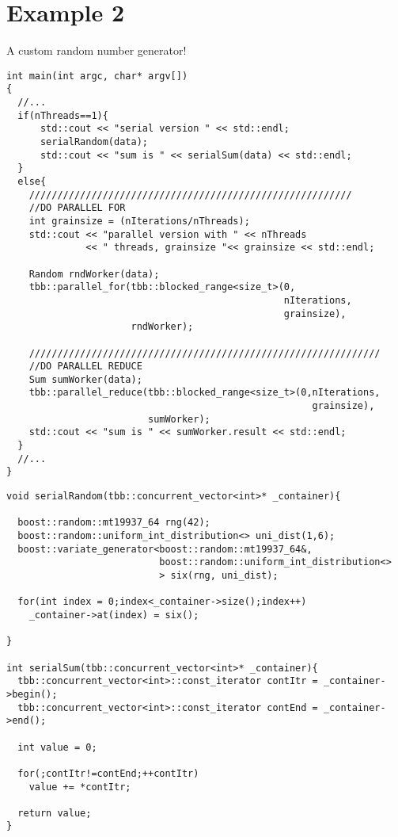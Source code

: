 \documentclass[a4paper]{article}
\begin{document}
\section*{Example 2}
A custom random number generator!
\begin{lstlisting}[float=ht,caption={\large \textbf{Calling Serial and Parallel Code}}]
int main(int argc, char* argv[])
{
  //...
  if(nThreads==1){
      std::cout << "serial version " << std::endl;
      serialRandom(data);
      std::cout << "sum is " << serialSum(data) << std::endl;
  }
  else{
    /////////////////////////////////////////////////////////
    //DO PARALLEL FOR
    int grainsize = (nIterations/nThreads);
    std::cout << "parallel version with " << nThreads  
              << " threads, grainsize "<< grainsize << std::endl;
  
    Random rndWorker(data);
    tbb::parallel_for(tbb::blocked_range<size_t>(0,
                                                 nIterations,
                                                 grainsize),
                      rndWorker);
  
    //////////////////////////////////////////////////////////////
    //DO PARALLEL REDUCE
    Sum sumWorker(data);
    tbb::parallel_reduce(tbb::blocked_range<size_t>(0,nIterations,
                                                      grainsize),
                         sumWorker);
    std::cout << "sum is " << sumWorker.result << std::endl;
  }
  //...
}
\end{lstlisting}
\newpage
\begin{lstlisting}[float=ht,caption={\large \textbf{Serial}}]
void serialRandom(tbb::concurrent_vector<int>* _container){
  
  boost::random::mt19937_64 rng(42);
  boost::random::uniform_int_distribution<> uni_dist(1,6);
  boost::variate_generator<boost::random::mt19937_64&, 
                           boost::random::uniform_int_distribution<> 
                           > six(rng, uni_dist);

  for(int index = 0;index<_container->size();index++)
    _container->at(index) = six();

}

int serialSum(tbb::concurrent_vector<int>* _container){
  tbb::concurrent_vector<int>::const_iterator contItr = _container->begin();
  tbb::concurrent_vector<int>::const_iterator contEnd = _container->end();

  int value = 0;

  for(;contItr!=contEnd;++contItr)
    value += *contItr;

  return value;
}
\end{lstlisting}
\end{document}
